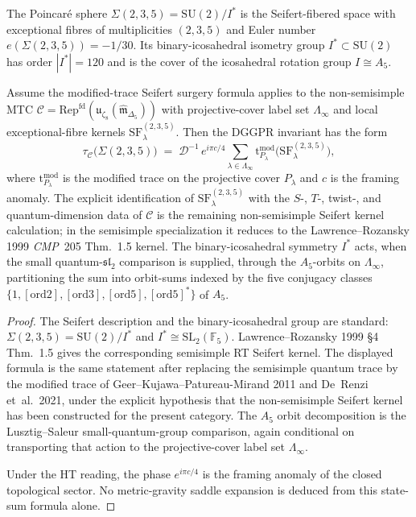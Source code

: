 \begin{proposition}
\label{thm:thqghr-poincare-seifert-closed-form}
The Poincar\'e sphere $\Sigma(2, 3, 5) = \mathrm{SU}(2)/I^*$ is the
Seifert-fibered space with exceptional fibres of multiplicities
$(2, 3, 5)$ and Euler number $e(\Sigma(2, 3, 5)) = -1/30$. Its
binary-icosahedral isometry group $I^*\subset\mathrm{SU}(2)$ has
order $|I^*| = 120$ and is the cover of the icosahedral rotation
group $I\cong A_5$.

Assume the modified-trace Seifert surgery formula applies to the
non-semisimple MTC $\mathcal C =
\mathrm{Rep}^{\mathrm{fd}}(\mathfrak u_{\zeta_8}
(\widehat{\mathfrak m}_{\Delta_5}))$ with projective-cover label set
$\Lambda_\infty$ and local exceptional-fibre kernels
$\mathrm{SF}^{(2,3,5)}_\lambda$. Then the DGGPR invariant has the form
\[
 \tau_{\mathcal C}\!\bigl(\Sigma(2, 3, 5)\bigr)
 \;=\;
 \mathcal D^{-1}\,e^{i\pi c/4}
 \sum_{\lambda\in\Lambda_\infty}
 \mathrm{t}^{\mathrm{mod}}_{P_\lambda}
 \bigl(\mathrm{SF}^{(2,3,5)}_\lambda\bigr),
\]
where $\mathrm{t}^{\mathrm{mod}}_{P_\lambda}$ is the modified trace on
the projective cover $P_\lambda$ and $c$ is the framing anomaly. The
explicit identification of $\mathrm{SF}^{(2,3,5)}_\lambda$ with the
$S$-, $T$-, twist-, and quantum-dimension data of
$\mathcal C$ is the remaining non-semisimple Seifert kernel
calculation; in the semisimple specialization it reduces to the
Lawrence--Rozansky 1999 \emph{CMP}~205 Thm.~1.5 kernel. The
binary-icosahedral symmetry $I^*$ acts, when the small
quantum-$\mathfrak{sl}_2$ comparison is supplied, through the
$A_5$-orbits on $\Lambda_\infty$, partitioning the sum into orbit-sums
indexed by the five conjugacy classes
$\{1, [\mathrm{ord}2], [\mathrm{ord}3], [\mathrm{ord}5], [\mathrm{ord}5]^*\}$
of $A_5$.
\end{proposition}

\begin{proof}
The Seifert description and the binary-icosahedral group are standard:
$\Sigma(2,3,5)=\mathrm{SU}(2)/I^*$ and
$I^*\cong \mathrm{SL}_2(\mathbb F_5)$. Lawrence--Rozansky 1999
\S 4 Thm.~1.5 gives the corresponding semisimple RT Seifert kernel.
The displayed formula is the same statement after replacing the
semisimple quantum trace by the modified trace of
Geer--Kujawa--Patureau-Mirand 2011 and De~Renzi et~al.\ 2021, under the
explicit hypothesis that the non-semisimple Seifert kernel has been
constructed for the present category. The $A_5$ orbit decomposition is
the Lusztig--Saleur small-quantum-group comparison, again conditional on
transporting that action to the projective-cover label set
$\Lambda_\infty$.

Under the HT reading, the phase $e^{i\pi c/4}$ is the framing anomaly
of the closed topological sector. No metric-gravity saddle expansion is
deduced from this state-sum formula alone.
\end{proof}
